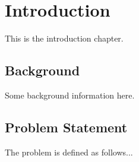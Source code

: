 \section{Introduction}

This is the introduction chapter.

\subsection{Background}
Some background information here.

\subsection{Problem Statement}
The problem is defined as follows...
